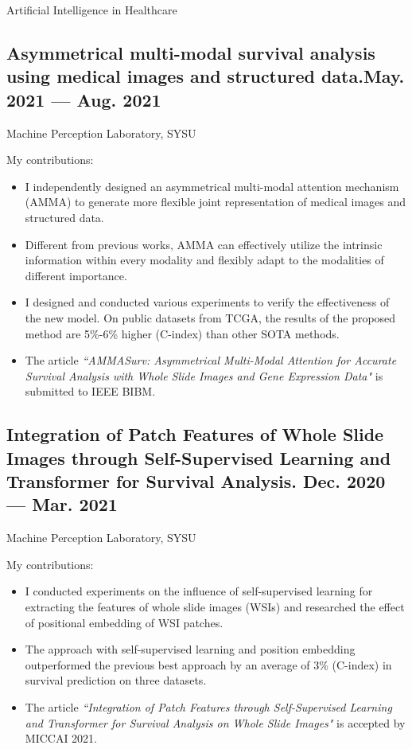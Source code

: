\documentclass[a4,11pt]{article}
\newcommand{\subtext}[1]{
#1\par\vspace{-0.2cm}}
\begin{document}
\centerline{\textcolor{UI_blue}{Artificial Intelligence in Healthcare}}
\vspace {6pt}
\subsection*{Asymmetrical multi-modal survival analysis using medical images and structured data.\hfill May. 2021 --- Aug. 2021} 
\subtext{Machine Perception Laboratory, SYSU }
\vspace {6pt}
My contributions:
    \begin{itemize}[topsep = 0 pt, itemsep = 0 pt, parsep = 1 pt]
       \item I independently designed an asymmetrical multi-modal attention mechanism (AMMA) to generate more flexible joint representation of medical images and structured data. 
		\item Different from previous works, AMMA can effectively utilize the intrinsic information within every modality and flexibly adapt to the modalities of different importance.
		\item I designed and conducted various experiments to verify the effectiveness of the new model.  On public datasets from TCGA, the results of the proposed method are 5\%-6\% higher (C-index) than other SOTA methods. 
        \item The article \textit{``AMMASurv: Asymmetrical Multi-Modal Attention for Accurate Survival Analysis with Whole Slide Images and Gene Expression Data"} is submitted to IEEE BIBM.
    \end{itemize}


\subsection*{Integration of Patch Features of Whole Slide Images through Self-Supervised Learning and Transformer for Survival Analysis. \hfill Dec. 2020 --- Mar. 2021}
\subtext{Machine Perception Laboratory, SYSU}  
\vspace {6pt}
My contributions:
    \begin{itemize}[topsep = 0 pt, itemsep = 0 pt, parsep = 1 pt]
        \item I conducted experiments on the influence of self-supervised learning for extracting the features of whole slide images (WSIs) and researched the effect of positional embedding of WSI patches. 
		\item The approach with self-supervised learning and position embedding outperformed the previous best approach by an average of 3\% (C-index) in survival prediction on three datasets.
		\item The article \textit{``Integration of Patch Features through Self-Supervised Learning and Transformer for Survival Analysis on Whole Slide Images"} is accepted by MICCAI 2021.
    \end{itemize}
\end{document}
